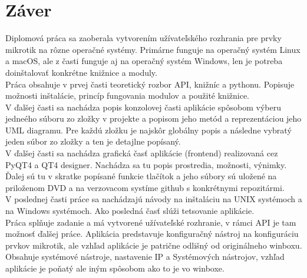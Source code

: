 \chapter{Záver}
Diplomová práca sa zaoberala vytvorením užívateľského rozhrania pre prvky mikrotik na rôzne operačné systémy. Primárne funguje na operačný systém Linux a macOS, ale z časti funguje aj na operačný systém Windows, len je potreba doinštalovať konkrétne knižnice a moduly.\\
Práca obsahuje v prvej časti teoretický rozbor API, knižníc a pythonu. Popisuje možnosti inštalácie, princíp fungovania modulov a použité knižnice.\\
V ďalšej časti sa nachádza popis konzolovej časti aplikácie spôsobom výberu jedneého súboru zo zložky v projekte a popisom jeho metód  a reprezentáciou jeho UML diagramu. Pre každú zložku je najskôr globálny popis a následne vybratý jeden súbor zo zložky a ten je detajlne popísaný.\\
V ďalšej časti  sa nachádza grafická časť aplikácie (frontend) realizovaná cez PyQT4 a QT4 designer. Nachádza sa tu popis prostredia, možnosti, výnimky. Ďalej sú tu v skratke popísané funkcie tlačítok a jeho súbory sú uložené na priloženom DVD a na verzovacom systíme github s konkrétnymi repozitármi.\\
V poslednej časti  práce sa nachádzajú návody na inštaláciu na UNIX systémoch  a na Windows systémoch. Ako posledná časť slúži tetsovanie aplikácie. \\
Práca splňuje zadanie a má vytvorené užívateľské rozhranie,  v rámci API je tam možnosť ďalšej práce. Aplikácia predstavuje konfiguračný nástroj na konfiguráciu prvkov mikrotik, ale vzhľad aplikácie je patrične odlišný od originálneho winboxu. Obsahuje systémové nástroje, nastavenie IP a Systémových nástrojov, vzhľad aplikácie je poňatý ale iným spôsobom ako to je vo winboxe. 